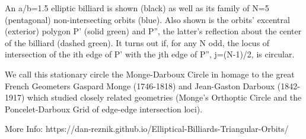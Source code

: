 An a/b=1.5 elliptic billiard is shown (black) as well as its family of N=5 (pentagonal) non-intersecting orbits (blue). Also shown is the orbits' excentral (exterior) polygon P' (solid green) and P'', the latter's reflection about the center of the billiard (dashed green). It turns out if, for any N odd, the locus of intersection of the ith edge of P' with the jth edge of P'', j=(N-1)/2, is circular.

We call this stationary circle the Monge-Darboux Circle in homage to the great French Geometers Gaspard Monge (1746-1818) and Jean-Gaston Darboux (1842-1917) which studied closely related geometries (Monge's Orthoptic Circle and the Poncelet-Darboux Grid of edge-edge intersection loci).

More Info: https://dan-reznik.github.io/Elliptical-Billiards-Triangular-Orbits/
